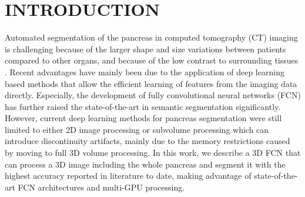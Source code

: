 \documentclass[a4paper]{spie}  %
\begin{document}
\section{INTRODUCTION}
Automated segmentation of the pancreas in computed tomography (CT) imaging is challenging because of the larger shape and size variations between patients compared to other organs, and because of the low contrast to surrounding tissues \cite{roth2017spatial}. Recent advantages have mainly been due to the application of deep learning based methods that allow the efficient learning of features from the imaging data directly. Especially, the development of fully convolutional neural networks (FCN) \cite{long2015fully} has further raised the state-of-the-art in semantic segmentation significantly. However, current deep learning methods for pancreas segmentation were still limited to either 2D image processing \cite{roth2017spatial,zhou2016pancreas} or subvolume processing \cite{roth2017hierarchical} which can introduce discontinuity artifacts, mainly due to the memory restrictions caused by moving to full 3D volume processing. In this work, we describe a 3D FCN that can process a 3D image including the whole pancreas and segment it with the highest accuracy reported in literature to date, making advantage of state-of-the-art FCN architectures and multi-GPU processing.

\end{document}
